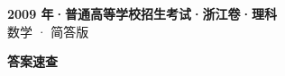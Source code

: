 \documentclass[zihao=-4, a4paper]{ctexart}
\begin{document}
\begin{center}
  {\Large\bfseries 2009 年·普通高等学校招生考试·浙江卷·理科}\\[4pt]
  {\large 数学 · 简答版}
\end{center}
\medskip
{}

\clearpage
{}
\begin{center}{\Large\bfseries 答案速查}\end{center}
\medskip

\end{document}
